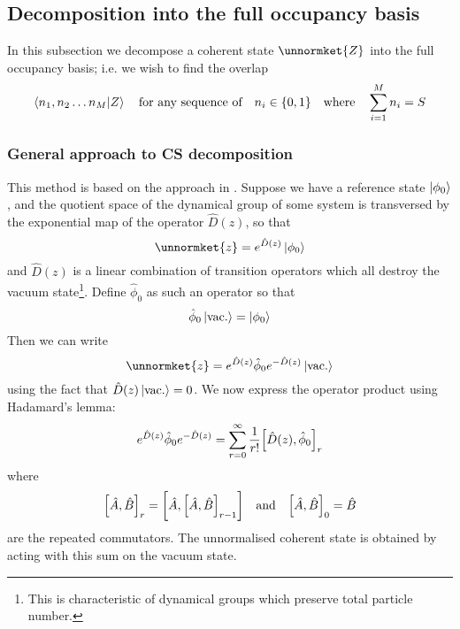 \documentclass[12pt]{article}
\begin{document}
	\subsection{Decomposition into the full occupancy basis}
	In this subsection we decompose a coherent state $\unnormket{Z}$ into the full occupancy basis; i.e. we wish to find the overlap
	\begin{equation}
	\braket{n_1,n_2\dots n_M}{Z}\qq{for any sequence of}n_i\in\{0,1\}\qq{where}\sum_{i=1}^M n_i=S
	\end{equation}
	\subsubsection{General approach to CS decomposition}
	This method is based on the approach in \cite[App. E]{buonsante}. Suppose we have a reference state $\ket{\phi_0}$, and the quotient space of the dynamical group of some system is transversed by the exponential map of the operator $\hat{D}(z)$, so that
	\begin{equation}
	\unnormket{z}=e^{\hat{D}(z)}\ket{\phi_0}
	\end{equation}
	and $\hat{D}(z)$ is a linear combination of transition operators which all destroy the vacuum state\footnote{This is characteristic of dynamical groups which preserve total particle number.}. Define $\hat{\phi}_0$ as such an operator so that
	\begin{equation}
	\hat{\phi}_0\ket{\rm vac.} = \ket{\phi_0}
	\end{equation}
	Then we can write
	\begin{equation}
	\unnormket{z}=e^{\hat{D}(z)}\hat{\phi}_0e^{-\hat{D}(z)}\ket{\rm vac.}
	\end{equation}
	using the fact that $\hat{D}(z)\ket{\rm vac.}=0$. We now express the operator product using Hadamard's lemma:
	\begin{equation}\label{eq:hadamard sum}
	e^{\hat{D}(z)}\hat{\phi}_0e^{-\hat{D}(z)}=\sum_{r=0}^\infty \frac{1}{r!}\comm{\hat{D}(z)}{\hat{\phi}_0}_r
	\end{equation}
	where
	\begin{equation}
	\comm{\hat{A}}{\hat{B}}_r=\comm{\hat{A}}{\comm{\hat{A}}{\hat{B}}_{r-1}}\qq{and}\comm{\hat{A}}{\hat{B}}_0=\hat{B}
	\end{equation}
	are the repeated commutators. The unnormalised coherent state is obtained by acting with this sum on the vacuum state.
\end{document}
